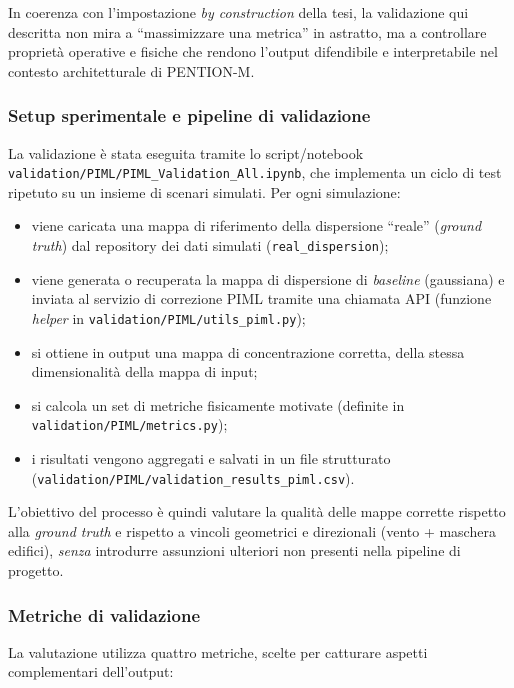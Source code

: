 In coerenza con l’impostazione \emph{by construction} della tesi, la validazione qui descritta non mira a ``massimizzare una metrica'' in astratto, ma a controllare proprietà operative e fisiche che rendono l’output difendibile e interpretabile nel contesto architetturale di \textsc{PENTION-M}.

\subsubsection{Setup sperimentale e pipeline di validazione}
\label{sec:val_piml_setup}

La validazione è stata eseguita tramite lo script/notebook \texttt{validation/PIML/PIML\_Validation\_All.ipynb}, che implementa un ciclo di test ripetuto su un insieme di scenari simulati.
Per ogni simulazione:
\begin{itemize}
    \item viene caricata una mappa di riferimento della dispersione ``reale'' (\textit{ground truth}) dal repository dei dati simulati (\texttt{real\_dispersion});
    \item viene generata o recuperata la mappa di dispersione di \textit{baseline} (gaussiana) e inviata al servizio di correzione PIML tramite una chiamata API (funzione \textit{helper} in \texttt{validation/PIML/utils\_piml.py});
    \item si ottiene in output una mappa di concentrazione corretta, della stessa dimensionalità della mappa di input;
    \item si calcola un set di metriche fisicamente motivate (definite in \texttt{validation/PIML/metrics.py});
    \item i risultati vengono aggregati e salvati in un file strutturato (\texttt{validation/PIML/validation\_results\_piml.csv}).
\end{itemize}

L’obiettivo del processo è quindi valutare la qualità delle mappe corrette rispetto alla \textit{ground truth} e rispetto a vincoli geometrici e direzionali (vento + maschera edifici), \emph{senza} introdurre assunzioni ulteriori non presenti nella pipeline di progetto.

\subsubsection{Metriche di validazione}
\label{sec:val_piml_metrics}

La valutazione utilizza quattro metriche, scelte per catturare aspetti complementari dell’output:

